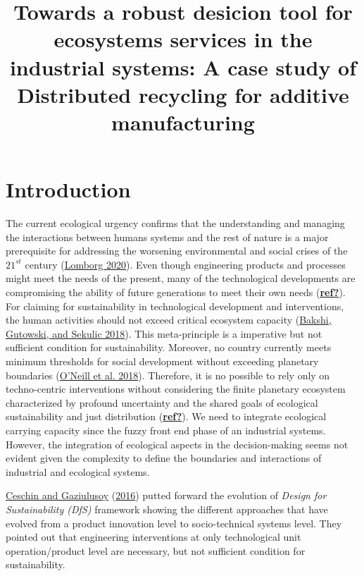 \documentclass[
]{article}
\title{Towards a robust desicion tool for ecosystems services in the industrial systems: A case study of Distributed recycling for additive manufacturing}
\author{}
\date{\vspace{-2.5em}}
\begin{document}
\maketitle

{
\hypersetup{linkcolor=}
\setcounter{tocdepth}{2}
\tableofcontents
}
\linenumbers

\hypertarget{introduction}{%
\section{Introduction}\label{introduction}}

The current ecological urgency confirms that the understanding and managing the interactions between humans systems and the rest of nature is a major prerequisite for addressing the worsening environmental and social crises of the \(21^{st}\) century (\protect\hyperlink{ref-Lomborg2020}{Lomborg 2020}).
Even though engineering products and processes might meet the needs of the present, many of the technological developments are compromising the ability of future generations to meet their own needs (\protect\hyperlink{ref-ref}{\textbf{ref?}}).
For claiming for sustainability in technological development and interventions, the human activities should not exceed critical ecosystem capacity (\protect\hyperlink{ref-Bakshi2018}{Bakshi, Gutowski, and Sekulic 2018}).
This meta-principle is a imperative but not sufficient condition for sustainability.
Moreover, no country currently meets minimum thresholds for social development without exceeding planetary boundaries (\protect\hyperlink{ref-ONeill2018}{O'Neill et al. 2018}).
Therefore, it is no possible to rely only on techno-centric interventions without considering the finite planetary ecosystem characterized by profound uncertainty and the shared goals of ecological sustainability and just distribution (\protect\hyperlink{ref-ref}{\textbf{ref?}}).
We need to integrate ecological carrying capacity since the fuzzy front end phase of an industrial systems.
However, the integration of ecological aspects in the decision-making seems not evident given the complexity to define the boundaries and interactions of industrial and ecological systems.

\protect\hyperlink{ref-Ceschin2016}{Ceschin and Gaziulusoy} (\protect\hyperlink{ref-Ceschin2016}{2016}) putted forward the evolution of \emph{Design for Sustainability (DfS)} framework showing the different approaches that have evolved from a product innovation level to socio-technical systems level.
They pointed out that engineering interventions at only technological unit operation/product level are necessary, but not sufficient condition for sustainability.
\end{document}
